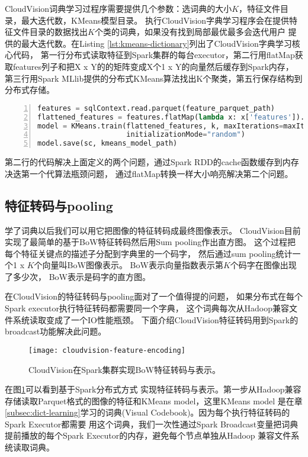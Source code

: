 CloudVision词典学习过程序需要提供几个参数：选词典的大小$K$，特征文件目录，最大迭代数，KMeans模型目录。
执行CloudVision字典学习程序会在提供特征文件目录的数据找出$K$个类的词典，如果没有找到局部最优最多会迭代用户
提供的最大迭代数。在Listing \ref{lst:kmeans-dictionary}列出了CloudVision字典学习核心代码，
第一行分布式读取特征到Spark集群的每台executor，第二行用flatMap获取features列子和把X x Y的的矩阵变成X个1 x Y的向量然后缓存到Spark内存，
第三行用Spark MLlib提供的分布式KMeans算法找出K个聚类，第五行保存结构到分布式存储。
\begin{lstlisting}[language=Python,
                   basicstyle=\small,
                   showstringspaces=false,
                   numbers=left,
                   caption={词典学习核心代码},
                   label={lst:kmeans-dictionary}]
features = sqlContext.read.parquet(feature_parquet_path)
flattened_features = features.flatMap(lambda x: x['features']).cache()
model = KMeans.train(flattened_features, k, maxIterations=maxIter,
                     initializationMode="random")
model.save(sc, kmeans_model_path)
\end{lstlisting}
第二行的代码解决上面定义的两个问题，通过Spark RDD的cache函数缓存到内存决迭第一个代算法瓶颈问题，
通过flatMap转换一样大小响亮解决第二个问题。


\subsection{特征转码与pooling}
\label{subsec:feature-encoding}
学了词典以后我们可以用它把图像的特征转码成最终图像表示。
CloudVision目前实现了最简单的基于BoW特征转码然后用Sum pooling作出直方图。
这个过程把每个特征关键点的描述子分配到字典里的一个码字，
然后通过sum pooling统计一个1 x $K$个向量叫BoW图像表示。
BoW表示向量指数表示第$K$个码字在图像出现了多少次，
BoW表示是码字的直方图。

在CloudVision的特征转码与pooling面对了一个值得提的问题，
如果分布式在每个Spark executor执行特征转码都需要同一个字典，
这个词典每次从Hadoop兼容文件系统读取变成了一个IO性能瓶颈。
下面介绍CloudVision特征转码用到Spark的broadcast功能解决此问题。


\begin{figure}[h]
  \centering
    \texttt{[image: cloudvision-feature-encoding]}
  \caption{CloudVision在Spark集群实现BoW特征转码与表示。}
  \label{fig:cloudvision-feature-encoding}
\end{figure}
在图\ref{fig:cloudvision-feature-encoding}可以看到基于Spark分布式方式
实现特征转码与表示。第一步从Hadoop兼容存储读取Parquet格式的图像的特征和KMeans model，这里KMeans model
是在章\ref{subsec:dict-learning}学习的词典(Visual Codebook)。因为每个执行特征转码的Spark Executor都需要
用这个词典，我们一次性通过Spark Broadcast变量把词典提前播放的每个Spark Executor的内存，避免每个节点单独从Hadoop
兼容文件系统读取词典。\cite{spark-programming-guide}

